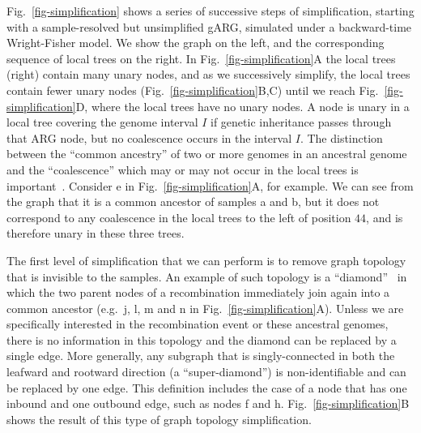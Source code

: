 \documentclass{article}
\newcommand{\noderef}[1]{\textsf{#1}}
\begin{document}
Fig.~\ref{fig-simplification} shows a series of successive steps of
simplification,
starting with a sample-resolved but unsimplified gARG, simulated under a
backward-time Wright-Fisher
model. We show the graph on the left, and the corresponding sequence of
local trees on the right.
In Fig.~\ref{fig-simplification}A the local trees (right)
contain many unary nodes, and as we successively simplify,
the local trees contain fewer
unary nodes (Fig.~\ref{fig-simplification}B,C) until
we reach Fig.~\ref{fig-simplification}D, where the local trees
have no unary nodes.
A node is unary in a local tree covering the genome interval $I$
if genetic inheritance passes through that ARG node,
but no coalescence occurs in the interval $I$.
The distinction between the ``common ancestry'' of two or more genomes
in an ancestral genome and the ``coalescence'' which may or may
not occur in the local trees is
important~\citep{hudson1983testing,kelleher2016efficient}.
Consider \noderef{e} in Fig.~\ref{fig-simplification}A,
for example. We can see from the graph that it is a common
ancestor of  samples \noderef{a} and \noderef{b}, but
it does not correspond to any coalescence in the
local trees to the left of position $44$, and is therefore
unary in these three trees.

The first level of simplification that we can perform is to remove
graph topology that is invisible to the samples.
An example of such topology is a
``diamond''~\citep{rasmussen2014genome}
in which the two parent nodes of a recombination immediately
join again into a common ancestor (e.g.~\noderef{j}, \noderef{l}, \noderef{m}
and \noderef{n} in Fig.~\ref{fig-simplification}A).
Unless we are specifically
interested in the recombination event or these ancestral genomes,
there is no information in this topology and the diamond can be
replaced by a single edge. More generally, any
subgraph that is singly-connected in both the leafward and
rootward direction (a ``super-diamond'') is non-identifiable and can be
replaced by one edge. This definition includes the case
of a node that has one inbound and one outbound edge, such as
nodes \noderef{f} and \noderef{h}.
Fig.~\ref{fig-simplification}B shows the result of this type of
graph topology simplification.
\end{document}
